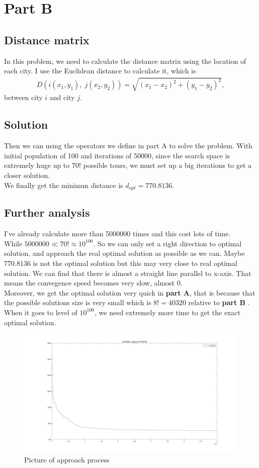 \documentclass{article}
\begin{document}
\section*{Part B}
\subsection*{Distance matrix}
In this problem, we need to calculate the distance matrix using the location of each city.
I use the Euclidean distance to calculate it, which is 
\begin{align*}
  D(i(x_1,y_1),\; j(x_2,y_2))=\sqrt{(x_1 - x_2)^2 + (y_1 - y_2)^2} ,
\end{align*}
between city $i$ and city $j$.

\subsection*{Solution}
Then we can using the operators we define in part A to solve the problem.
With initial population of 100 and iterations of 50000, since the search space is extremely huge 
up to $70!$ possible tours, we must set up a big iterations to get a closer solution.\\
We finally get the minimun distance is $d_{opt}=770.8136$.

\subsection*{Further analysis}
I've already calculate more than 5000000 times and this cost lots of time.\\
While $5000000\ll 70!\approx 10^{100} $.
So we can only set a right direction to optimal solution, and approach the real optimal solution as possible
as we can. Maybe $770.8136$ is not the optimal solution but this may very close to real optimal solution.
We can find that there is almost a straight line parallel to x-axis.
That means the convegence speed becomes very slow, almost 0.\\
Moreover, we get the optimal solution very quick in \textbf{part A},
that is because that the possible solutions size is very small which is $8!=40320$ relative to \textbf{part B} .
When it goes to level of $10^{100}$, we need extremely more time to get the exact optimal solution.

\begin{figure}[htbp]
  \centering
  \includegraphics[scale=0.15]{figure1.jpg}
  \caption*{Picture of approach process}
\end{figure}
\newpage
\end{document}
